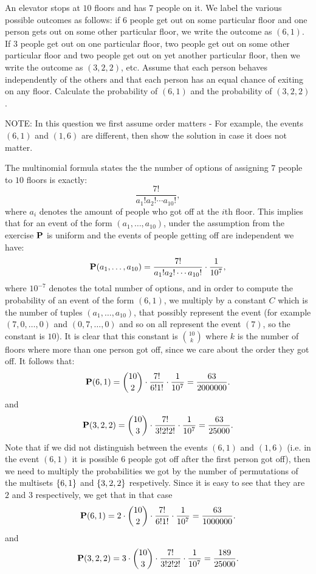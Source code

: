 \documentclass[11pt,a4paper]{article}
\begin{document}
\begin{exercise}
  An elevator stops at $10$ floors and has $7$ people on it.
  We label the various possible outcomes as follows:
  if $6$ people get out on some particular floor and one person gets out
  on some other particular floor, we write the outcome as $(6,1)$.
  If $3$ people get out on one particular floor, two people get
  out on some other particular floor and two people get out on yet another
  particular floor, then we write the outcome as $(3,2,2)$, etc.
  Assume that each person behaves independently of the others and that
  each person has an equal chance of exiting on any floor.
  Calculate the probability of $(6,1)$ and the probability of $(3,2,2)$.
\end{exercise}
\begin{solution}
  NOTE: In this question we first assume order matters -
  For example, the events $(6,1)$ and $(1,6)$ are different,
  then show the solution in case it does not matter.

  The multinomial formula states the the number of options of assigning
  $7$ people to $10$ floors is exactly:
  \[
    \frac{7!}{a_1 ! a_2 ! \cdots a_{10}!},
  \]
  where $a_i$ denotes the amount of people who got off at the $i$th floor.
  This implies that for an event of the form $(a_1,\dots,a_{10})$,
  under the assumption from the exercise $\mathbf{P}$ is uniform
  and the events of people getting off are independent we have:
  \[
    \mathbf{P}(a_1,\dots,a_{10}) =
    \frac{7!}{a_1 ! a_2 ! \cdots a_{10}!} \cdot \frac{1}{10^7},
  \]
  where $10^{-7}$ denotes the total number of options,
  and in order to compute the probability of an event of the form $(6,1)$,
  we multiply by a constant $C$ which is the number of tuples $(a_1,\dots,a_{10})$,
  that possibly represent the event (for example $(7,0,\dots,0)$ and $(0,7,\dots,0)$
  and so on all represent the event $(7)$, so the constant is $10$).
  It is clear that this constant is $\binom{10}{k}$ where $k$ is the number
  of floors where more than one person got off, since we care about the order
  they got off.
  It follows that:
  \[
    \mathbf{P}(6,1) =
    \binom{10}{2} \cdot \frac{7!}{6! 1!} \cdot \frac{1}{10^7} =
    \frac{63}{2000000}.
  \]
  and
  \[
    \mathbf{P}(3,2,2) =
    \binom{10}{3} \cdot \frac{7!}{3! 2! 2!} \cdot \frac{1}{10^7} =
    \frac{63}{25000}.
  \]
  Note that if we did not distinguish between the events $(6,1)$
  and $(1,6)$ (i.e. in the event $(6,1)$ it is possible $6$ people got off
  after the first person got off),
  then we need to multiply the probabilities we got by the
  number of permutations of the multisets $\left\{6,1\right\}$ and $\left\{3,2,2\right\}$
  respetively. Since it is easy to see that they are $2$ and $3$
  respectively, we get that in that case
  \[
    \mathbf{P}(6,1) =
    2 \cdot \binom{10}{2} \cdot \frac{7!}{6! 1!} \cdot \frac{1}{10^7} =
    \frac{63}{1000000}.
  \]
  and
  \[
    \mathbf{P}(3,2,2) =
    3 \cdot \binom{10}{3} \cdot \frac{7!}{3! 2! 2!} \cdot \frac{1}{10^7} =
    \frac{189}{25000}.
  \]
\end{solution}
\end{document}
